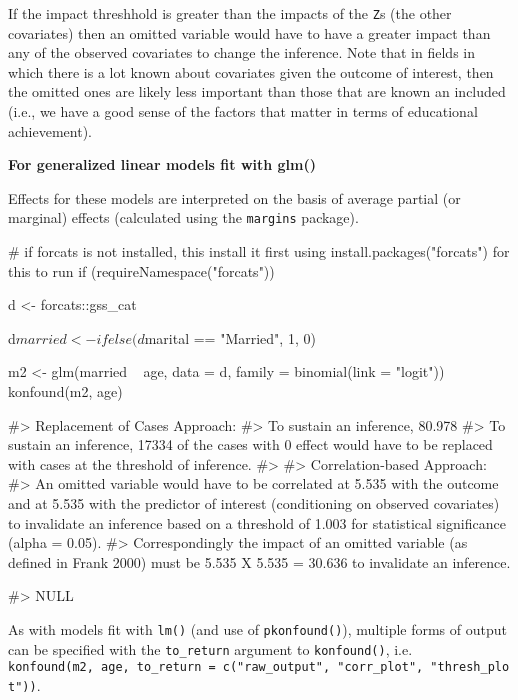 If the impact threshhold is greater than the impacts of the \texttt{Z}s
(the other covariates) then an omitted variable would have to have a
greater impact than any of the observed covariates to change the
inference. Note that in fields in which there is a lot known about
covariates given the outcome of interest, then the omitted ones are
likely less important than those that are known an included (i.e., we
have a good sense of the factors that matter in terms of educational
achievement).

\textbf{For generalized linear models fit with glm()}

Effects for these models are interpreted on the basis of average partial
(or marginal) effects (calculated using the \texttt{margins} package).

\begin{Schunk}
\begin{Sinput}
# if forcats is not installed, this install it first using install.packages("forcats") for this to run
if (requireNamespace("forcats")) {
    d <- forcats::gss_cat
    
    d$married <- ifelse(d$marital == "Married", 1, 0)
    
    m2 <- glm(married ~ age, data = d, family = binomial(link = "logit"))
    konfound(m2, age)
}
\end{Sinput}
\begin{Soutput}
#> Replacement of Cases Approach:
#> To sustain an inference, 80.978% of the estimate would have to be due to bias. This is based on a threshold of 0.013 for statistical significance (alpha = 0.05).
#> To sustain an inference, 17334 of the cases with 0 effect would have to be replaced with cases at the threshold of inference.
#> 
#> Correlation-based Approach:
#> An omitted variable would have to be correlated at 5.535 with the outcome and at 5.535 with the predictor of interest (conditioning on observed covariates) to invalidate an inference based on a threshold of 1.003 for statistical significance (alpha = 0.05).
#> Correspondingly the impact of an omitted variable (as defined in Frank 2000) must be 5.535 X 5.535 = 30.636 to invalidate an inference.
\end{Soutput}
\begin{Soutput}
#> NULL
\end{Soutput}
\end{Schunk}

As with models fit with \texttt{lm()} (and use of \texttt{pkonfound()}),
multiple forms of output can be specified with the \texttt{to\_return}
argument to \texttt{konfound()}, i.e.
\texttt{konfound(m2,\ age,\ to\_return\ =\ c("raw\_output",\ "corr\_plot",\ "thresh\_plot"))}.

